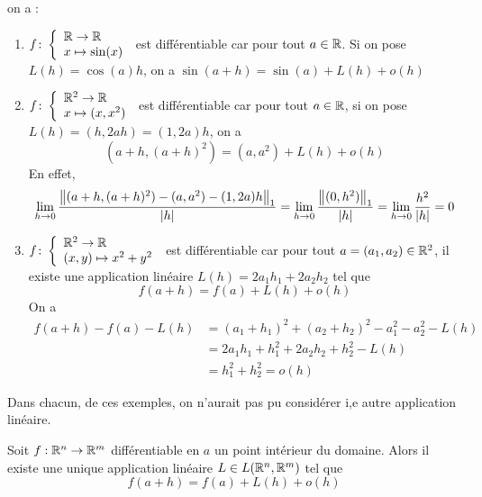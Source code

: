          \begin{exemple}
             on a :
             \begin{enumerate}
                 \item $f\colon \left\{\begin{array}{l}\mathbb{R}\to \mathbb{R} \\x\mapsto \sin(x)\end{array}\right.$ est différentiable car pour tout $a\in \mathbb{R}$. Si on pose $L(h)=\cos(a)h$, on a $\sin(a+h)=\sin(a)+L(h) +o(h)$
                 \item $f\colon \left\{\begin{array}{l}\mathbb{R}^2\to \mathbb{R} \\x\mapsto(x,x^2)\end{array}\right.$ est différentiable car pour tout $a\in \mathbb{R}$, si on pose $L(h)=(h,2ah)=(1,2a)h$, on a 
                 \begin{equation*}
                    (a+h,(a+h)^2)=(a,a^2)+L(h) +o(h) 
                 \end{equation*}
                 En effet,
                 \begin{equation*}
                     \lim\limits_{h\to 0}\frac{\left\| (a+h,(a+h)^2)-(a,a^2)-(1,2a)h \right\|_1}{|h|}=\lim\limits_{h\to 0}\frac{\left\| (0,h^2) \right\|_1}{|h|}=\lim_{h\to 0}\frac{h^2}{|h|}=0
                 \end{equation*}
                 \item $f\colon \left\{\begin{array}{l}\mathbb{R}^2\to \mathbb{R} \\(x,y)\mapsto x^2+y^2\end{array}\right.$ est différentiable car pour tout $a=(a_1,a_2)\in \mathbb{R}^2$, il existe une application linéaire $L(h)=2a_1h_1+2a_2h_2$ tel que 
                 \begin{equation*}
                     f(a+h)=f(a)+L(h)+o(h)
                 \end{equation*}
                 On a 
                 \begin{align*}
                    f(a+h)-f(a) -L(h) &= (a_1+h_1)^2+(a_2+h_2)^2-a_1^2-a_2^2-L(h)\\
                    &= 2a_1h_1+h_1^2+2a_2h_2+h_2^2-L(h)\\
                    &= h_1^2+h_2^2=o(h)
                 \end{align*}
             \end{enumerate}
         \end{exemple}
         Dans chacun, de ces exemples, on n'aurait pas pu considérer i,e autre application linéaire.
         \begin{proposition}
             Soit $f:\mathbb{R}^n\to \mathbb{R}^m$ différentiable en $a$ un point intérieur du domaine. Alors il existe une unique application linéaire $L\in L(\mathbb{R}^n,\mathbb{R}^m)$ tel que 
             \begin{equation*}
                 f(a+h)=f(a)+L(h)+o(h)
             \end{equation*}
         \end{proposition}
